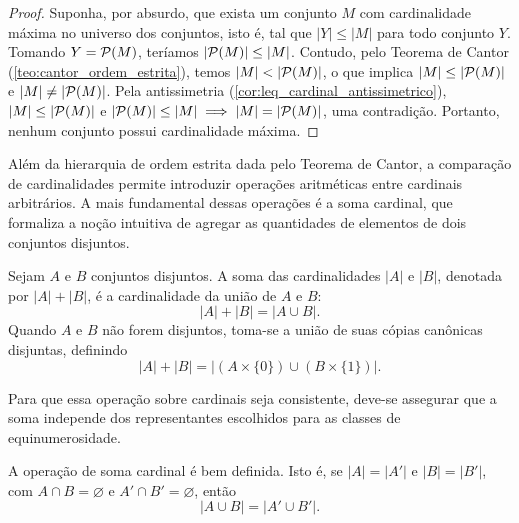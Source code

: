 \begin{proof}
    Suponha, por absurdo, que exista um conjunto \(M\) com cardinalidade máxima no universo dos conjuntos, isto é, tal que \(|Y| \leq |M|\) para todo conjunto \(Y\). Tomando \(Y = \mathcal{P}(M)\), teríamos \(|\mathcal{P}(M)| \leq |M|\). Contudo, pelo Teorema de Cantor (\autoref{teo:cantor_ordem_estrita}), temos \(|M| < |\mathcal{P}(M)|\), o que implica \(|M| \leq |\mathcal{P}(M)|\) e \(|M| \neq |\mathcal{P}(M)|\). Pela antissimetria (\autoref{cor:leq_cardinal_antissimetrico}), \(|M| \leq |\mathcal{P}(M)|\) e \(|\mathcal{P}(M)| \leq |M| \implies |M| = |\mathcal{P}(M)|\), uma contradição. Portanto, nenhum conjunto possui cardinalidade máxima.
\end{proof}

Além da hierarquia de ordem estrita dada pelo Teorema de Cantor, a comparação de cardinalidades permite introduzir operações aritméticas entre cardinais arbitrários. A mais fundamental dessas operações é a soma cardinal, que formaliza a noção intuitiva de agregar as quantidades de elementos de dois conjuntos disjuntos.

\begin{definicao}
    \label{def:soma_cardinal}
    Sejam \(A\) e \(B\) conjuntos disjuntos. A soma das cardinalidades \(|A|\) e \(|B|\), denotada por \(|A| + |B|\), é a cardinalidade da união de \(A\) e \(B\):
    \[
        |A| + |B| = |A \cup B|.
    \]
    Quando \(A\) e \(B\) não forem disjuntos, toma-se a união de suas cópias canônicas disjuntas, definindo
    \[
        |A| + |B| = |(A \times \{0\}) \cup (B \times \{1\})|.
    \]
\end{definicao}

Para que essa operação sobre cardinais seja consistente, deve-se assegurar que a soma independe dos representantes escolhidos para as classes de equinumerosidade.

\begin{lema}
    \label{lem:soma_cardinal_bem_definida}
    A operação de soma cardinal é bem definida. Isto é, se \(|A| = |A'|\) e \(|B| = |B'|\), com \(A \cap B = \varnothing\) e \(A' \cap B' = \varnothing\), então
    \[
        |A \cup B| = |A' \cup B'|.
    \]
\end{lema}


